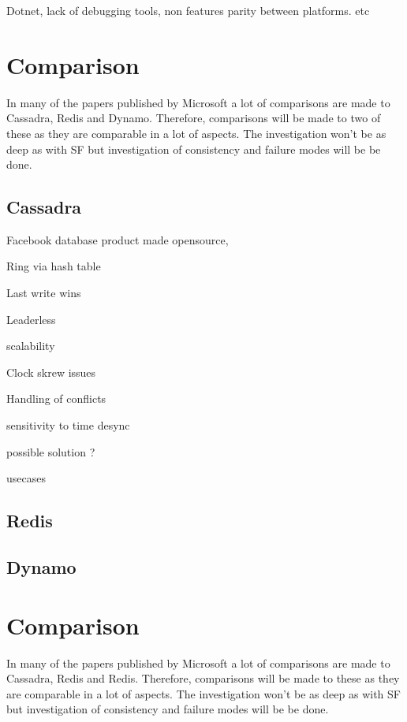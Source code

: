 \documentclass[a4paper,10pt,titlepage]{report}
\begin{document}
    
    
    Dotnet, lack of debugging tools, non features parity between platforms. etc



    \section{Comparison}
    In many of the papers published by Microsoft a lot of comparisons are made to Cassadra, Redis and Dynamo. Therefore, comparisons will be made to two of these as they are comparable in a lot of aspects. The investigation won't be as deep as with SF but investigation of consistency and failure modes will be be done.
    
    
    
    \subsection{Cassadra}
    
    Facebook database product made opensource,
    
    Ring via hash table
    
    Last write wins
    
    Leaderless
    
    scalability
    
    Clock skrew issues
    
    Handling of conflicts
    
    sensitivity to time desync
    
    possible solution ?
    
    usecases
    
    

    \subsection{Redis}

    \subsection{Dynamo}


    \section{Comparison}
    In many of the papers published by Microsoft a lot of comparisons are made to Cassadra, Redis and Redis. Therefore, comparisons will be made to these as they are comparable in a lot of aspects. The investigation won't be as deep as with SF but investigation of consistency and failure modes will be be done.
\end{document}
